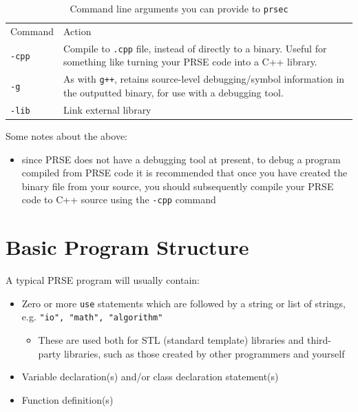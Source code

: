 \documentclass[letterpaper, 12pt]{article}
\begin{document}
\begin{table}[h]
   \centering
   \captionsetup{justification=centering}
   \caption{Command line arguments you can provide to \texttt{prsec}}
   \rule{0pt}{0.5cm} 
   \begin{tabularx}{400pt}{|X|X|}
      \hline
      Command            & Action           \\
      \texttt{-cpp}      & Compile to \texttt{.cpp} file, instead of directly to a binary. Useful for
                           something like turning your PRSE code into a C++ library. \\
      \texttt{-g}        & As with \texttt{g++}, retains source-level debugging/symbol information in the
                           outputted binary, for use with a debugging tool.\\
      \texttt{-lib}      & Link external library \\
      \hline
   \end{tabularx}
   \label{tab:command-args}
\end{table}

Some notes about the above:
\begin{itemize}
   \item since PRSE does not have a debugging tool at present, to debug a program compiled from PRSE
      code it is recommended that once you have created the binary file from your source, you should
      subsequently compile your PRSE code to C++ source using the \texttt{-cpp} command
\end{itemize}

\newpage

\section{Basic Program Structure}

A typical PRSE program will usually contain:

\begin{itemize}
\item Zero or more \texttt{use} statements which are followed by a string or list of strings, e.g. \texttt{"io", "math", "algorithm"}
\begin{itemize}
   \item These are used both for STL (standard template) libraries and third-party libraries, such as those created by other programmers and yourself
\end{itemize}
\item Variable declaration(s) and/or class declaration statement(s)
\item Function definition(s)
\end{itemize}
\end{document}
